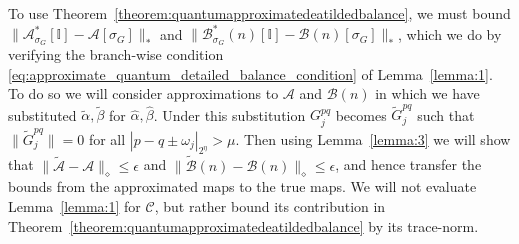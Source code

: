 \documentclass[aps,floatfix,10pt,amssymb,amsfont,amsmath,superscriptaddress,float,nofootinbib,longbibliography,nobalancelastpage,twocolumn]{revtex4-2}
\begin{document}
\begin{widetext}
To use Theorem~\ref{theorem:quantumapproximatedeatildedbalance}, we must bound $\|\mathcal{A}^*_{\sigma_G}[\mathbb{I}]-\mathcal{A}[\sigma_G]\|_*$ and $\|\mathcal{B}^*_{\sigma_G}(n)[\mathbb{I}]-\mathcal{B}(n)[\sigma_G]\|_*$, which we do by verifying the branch-wise condition \eqref{eq:approximate_quantum_detailed_balance_condition} of Lemma~\ref{lemma:1}. To do so we will consider approximations to $\mathcal{A}$ and $\mathcal{B}(n)$ in which we have substituted $\tilde \alpha, \tilde \beta$ for $\hat \alpha, \hat \beta$. Under this substitution $G^{pq}_j$ becomes $\tilde G^{pq}_j$ such that $\|\tilde G^{pq}_j\| =0$ for all $|p-q\pm\omega_{j}|_{2^{\eta}} > \mu$. Then using Lemma~\ref{lemma:3} we will show that $\|\tilde{\mathcal{A}}-\mathcal{A}\|_{\diamond} \leq \epsilon$ and $\|\tilde{\mathcal{B}}(n)-\mathcal{B}(n)\|_{\diamond} \leq \epsilon$, and hence transfer the bounds from the approximated maps to the true maps. We will not evaluate Lemma~\ref{lemma:1} for $\mathcal{C}$, but rather bound its contribution in Theorem~\ref{theorem:quantumapproximatedeatildedbalance} by its trace-norm.
\end{widetext}
\end{document}
